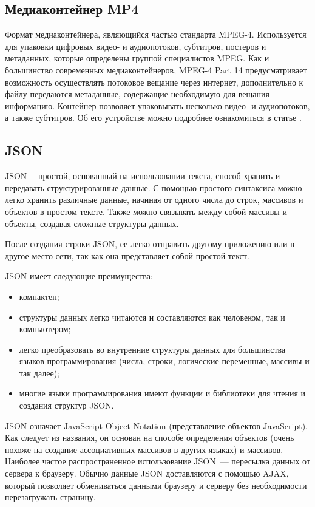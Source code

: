 \subsection{Медиаконтейнер MP4}
Формат медиаконтейнера, являющийся частью стандарта MPEG-4.
Используется для упаковки цифровых видео- и аудиопотоков, субтитров, постеров и метаданных,
которые определены группой специалистов MPEG.
Как и большинство современных медиаконтейнеров, MPEG-4 Part 14 предусматривает возможность
осуществлять потоковое вещание через интернет, дополнительно к файлу передаются метаданные,
содержащие необходимую для вещания информацию.
Контейнер позволяет упаковывать несколько видео- и аудиопотоков, а также субтитров.
Об его устройстве можно подробнее ознакомиться в статье \cite{mp4_doc}.

\subsection{JSON}
JSON~-- простой, основанный на использовании текста, способ хранить и передавать структурированные
данные. С помощью простого синтаксиса  можно легко хранить различные данные, начиная от одного числа
до строк, массивов и объектов в простом тексте. Также можно связывать между собой массивы и объекты,
создавая сложные структуры данных.

После создания строки JSON, ее легко отправить другому приложению или в другое место сети,
так как она представляет собой простой текст.

\medskip
JSON имеет следующие преимущества:
\smallskip
\begin{itemize}
	\item компактен;
	\item структуры данных легко читаются и составляются как человеком, так и компьютером;
	\item легко преобразовать во внутренние структуры данных для большинства языков программирования
	(числа, строки, логические переменные, массивы и так далее);
	\item многие языки программирования имеют функции и библиотеки для чтения и создания
	структур JSON.
\end{itemize}

JSON означает JavaScript Object Notation (представление объектов JavaScript). Как следует из названия,
он основан на способе определения объектов (очень похоже на создание ассоциативных массивов в других
языках) и массивов.
Наиболее частое распространенное использование JSON~--- пересылка данных от сервера к браузеру. Обычно
данные JSON доставляются с помощью AJAX, который позволяет обмениваться данными браузеру и серверу без
необходимости перезагружать страницу.

